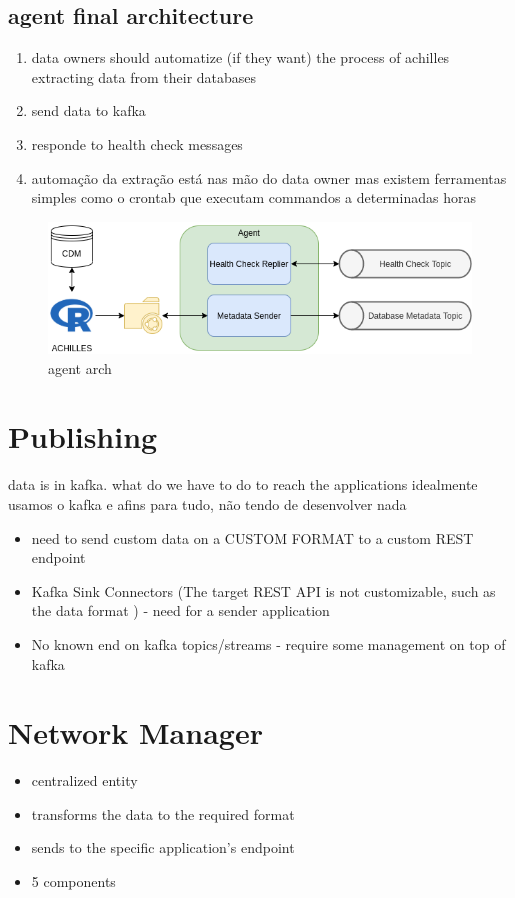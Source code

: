 
\subsection{agent final architecture}
\begin{enumerate}
    \item data owners should automatize (if they want) the process of achilles extracting data from their databases
    \item send data to kafka
    \item responde to health check messages
    \item automação da extração está nas mão do data owner mas existem ferramentas simples como o crontab que executam commandos a determinadas horas
\end{enumerate}

\begin{figure}
    \center
    \includegraphics[width=\textwidth]{agent-architecture}
    \caption{agent arch}
    \label{fig:agent-architecture}
\end{figure}

\section{Publishing}

data is in kafka. what do we have to do to reach the applications
idealmente usamos o kafka e afins para tudo, não tendo de desenvolver nada

\begin{itemize}
    \item need to send custom data on a CUSTOM FORMAT to a custom REST endpoint
    \item Kafka Sink Connectors (The target REST API is not customizable, such as the data format ) - need for a sender application
    \item No known end on kafka topics/streams - require some management on top of kafka
\end{itemize}

\section{Network Manager}  %
\begin{itemize}
    \item centralized entity
    \item transforms the data to the required format
    \item sends to the specific application's endpoint
    \item 5 components
\end{itemize}


